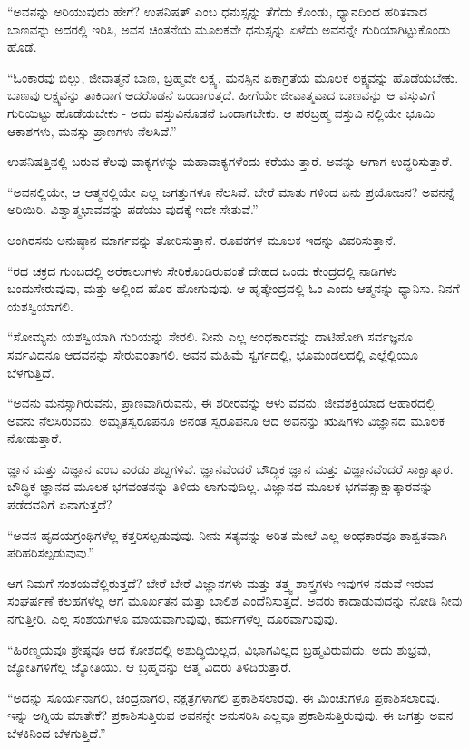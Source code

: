 “ಅವನನ್ನು ಅರಿಯುವುದು ಹೇಗೆ? ಉಪನಿಷತ್ ಎಂಬ ಧನುಸ್ಸನ್ನು ತೆಗೆದು ಕೊಂಡು, ಧ್ಯಾನದಿಂದ ಹರಿತವಾದ ಬಾಣವನ್ನು ಅದರಲ್ಲಿ ಇರಿಸಿ, ಅವನ ಚಿಂತನೆಯ ಮೂಲಕವೇ ಧನುಸ್ಸನ್ನು ಏಳೆದು ಅವನನ್ನೇ ಗುರಿಯಾಗಿಟ್ಟುಕೊಂಡು ಹೊಡೆ.

“ಓಂಕಾರವು ಬಿಲ್ಲು, ಜೀವಾತ್ಮನೆ ಬಾಣ, ಬ್ರಹ್ಮವೇ ಲಕ್ಷ್ಯ. ಮನಸ್ಸಿನ ಏಕಾಗ್ರತೆಯ ಮೂಲಕ ಲಕ್ಷ್ಯವನ್ನು ಹೊಡೆಯಬೇಕು. ಬಾಣವು ಲಕ್ಷ್ಯವನ್ನು ತಾಕಿದಾಗ ಅದರೊಡನೆ ಒಂದಾಗುತ್ತದೆ. ಹೀಗೆಯೇ ಜೀವಾತ್ಮವಾದ ಬಾಣವನ್ನು ಆ ವಸ್ತುವಿಗೆ ಗುರಿಯಿಟ್ಟು ಹೊಡೆಯಬೇಕು - ಅದು ವಸ್ತುವಿನೊಡನೆ ಒಂದಾಗಬೇಕು. ಆ ಪರಬ್ರಹ್ಮ ವಸ್ತುವಿ ನಲ್ಲಿಯೇ ಭೂಮಿ ಆಕಾಶಗಳು, ಮನಸ್ಸು ಪ್ರಾಣಗಳು ನೆಲಸಿವೆ.”

ಉಪನಿಷತ್ತಿನಲ್ಲಿ ಬರುವ ಕೆಲವು ವಾಕ್ಯಗಳನ್ನು ಮಹಾವಾಕ್ಯಗಳೆಂದು ಕರೆಯು ತ್ತಾರೆ. ಅವನ್ನು ಆಗಾಗ ಉದ್ಧರಿಸುತ್ತಾರೆ.

“ಅವನಲ್ಲಿಯೇ, ಆ ಆತ್ಮನಲ್ಲಿಯೇ ಎಲ್ಲ ಜಗತ್ತುಗಳೂ ನೆಲಸಿವೆ. ಬೇರೆ ಮಾತು ಗಳಿಂದ ಏನು ಪ್ರಯೋಜನ? ಅವನನ್ನೆ ಅರಿಯಿರಿ. ವಿಶ್ವಾತ್ಮಭಾವವನ್ನು ಪಡೆಯು ವುದಕ್ಕೆ ಇದೇ ಸೇತುವೆ.”

ಅಂಗಿರಸನು ಅನುಷ್ಠಾನ ಮಾರ್ಗವನ್ನು ತೋರಿಸುತ್ತಾನೆ. ರೂಪಕಗಳ ಮೂಲಕ ಇದನ್ನು ವಿವರಿಸುತ್ತಾನೆ.

“ರಥ ಚಕ್ರದ ಗುಂಬದಲ್ಲಿ ಅರೆಕಾಲುಗಳು ಸೇರಿಕೊಂಡಿರುವಂತೆ ದೇಹದ ಒಂದು ಕೇಂದ್ರದಲ್ಲಿ ನಾಡಿಗಳು ಬಂದುಸೇರುವುವು, ಮತ್ತು ಅಲ್ಲಿಂದ ಹೊರ ಹೋಗುವುವು. ಆ ಹೃತ್ಕೇಂದ್ರದಲ್ಲಿ ಓಂ ಎಂದು ಆತ್ಮನನ್ನು ಧ್ಯಾನಿಸು. ನಿನಗೆ ಯಶಸ್ವಿಯಾಗಲಿ.

“ಸೋಮ್ಯನು ಯಶಸ್ವಿಯಾಗಿ ಗುರಿಯನ್ನು ಸೇರಲಿ. ನೀನು ಎಲ್ಲ ಅಂಧಕಾರವನ್ನು ದಾಟಿಹೋಗಿ ಸರ್ವಜ್ಞನೂ ಸರ್ವವಿದನೂ ಆದವನನ್ನು ಸೇರುವಂತಾಗಲಿ. ಅವನ ಮಹಿಮೆ ಸ್ವರ್ಗದಲ್ಲಿ, ಭೂಮಂಡಲದಲ್ಲಿ ಎಲ್ಲೆಲ್ಲಿಯೂ ಬೆಳಗುತ್ತಿದೆ.

“ಅವನು ಮನಸ್ಸಾಗಿರುವನು, ಪ್ರಾಣವಾಗಿರುವನು, ಈ ಶರೀರವನ್ನು ಆಳು ವವನು. ಜೀವಶಕ್ತಿಯಾದ ಆಹಾರದಲ್ಲಿ ಅವನು ನೆಲಸಿರುವನು. ಅಮೃತಸ್ವರೂಪನೂ ಅನಂತ ಸ್ವರೂಪನೂ ಆದ ಅವನನ್ನು ಋಷಿಗಳು ವಿಜ್ಞಾನದ ಮೂಲಕ ನೋಡುತ್ತಾರೆ.

ಜ್ಞಾನ ಮತ್ತು ವಿಜ್ಞಾನ ಎಂಬ ಎರಡು ಶಬ್ದಗಳಿವೆ. ಜ್ಞಾನವೆಂದರೆ ಬೌದ್ಧಿಕ ಜ್ಞಾನ ಮತ್ತು ವಿಜ್ಞಾನವೆಂದರೆ ಸಾಕ್ಷಾತ್ಕಾರ. ಬೌದ್ಧಿಕ ಜ್ಞಾನದ ಮೂಲಕ ಭಗವಂತನನ್ನು ತಿಳಿಯ ಲಾಗುವುದಿಲ್ಲ. ವಿಜ್ಞಾನದ ಮೂಲಕ ಭಗವತ್ಸಾಕ್ಷಾತ್ಕಾರವನ್ನು ಪಡೆದವನಿಗೆ ಏನಾಗುತ್ತದೆ?

“ಅವನ ಹೃದಯಗ್ರಂಥಿಗಳೆಲ್ಲ ಕತ್ತರಿಸಲ್ಪಡುವುವು. ನೀನು ಸತ್ಯವನ್ನು ಅರಿತ ಮೇಲೆ ಎಲ್ಲ ಅಂಧಕಾರವೂ ಶಾಶ್ವತವಾಗಿ ಪರಿಹರಿಸಲ್ಪಡುವುವು.”

ಆಗ ನಿಮಗೆ ಸಂಶಯವೆಲ್ಲಿರುತ್ತದೆ? ಬೇರೆ ಬೇರೆ ವಿಜ್ಞಾನಗಳು ಮತ್ತು ತತ್ತ್ವ ಶಾಸ್ತ್ರಗಳು ಇವುಗಳ ನಡುವೆ ಇರುವ ಸಂಘರ್ಷಣೆ ಕಲಹಗಳೆಲ್ಲ ಆಗ ಮೂರ್ಖತನ ಮತ್ತು ಬಾಲಿಶ ಎಂದೆನಿಸುತ್ತದೆ. ಅವರು ಕಾದಾಡುವುದನ್ನು ನೋಡಿ ನೀವು ನಗುತ್ತೀರಿ. ಎಲ್ಲ ಸಂಶಯಗಳೂ ಮಾಯವಾಗುವುವು, ಕರ್ಮಗಳೆಲ್ಲ ದೂರವಾಗುವುವು.

“ಹಿರಣ್ಮಯವೂ ಶ್ರೇಷ್ಠವೂ ಆದ ಕೋಶದಲ್ಲಿ ಅಶುದ್ಧಿಯಿಲ್ಲದ, ವಿಭಾಗವಿಲ್ಲದ ಬ್ರಹ್ಮವಿರುವುದು. ಅದು ಶುಭ್ರವು, ಜ್ಯೋತಿಗಳಿಗೆಲ್ಲ ಜ್ಯೋತಿಯು. ಆ ಬ್ರಹ್ಮವನ್ನು ಆತ್ಮ ವಿದರು ತಿಳಿದಿರುತ್ತಾರೆ.

“ಅದನ್ನು ಸೂರ್ಯನಾಗಲಿ, ಚಂದ್ರನಾಗಲಿ, ನಕ್ಷತ್ರಗಳಾಗಲಿ ಪ್ರಕಾಶಿಸಲಾರವು. ಈ ಮಿಂಚುಗಳೂ ಪ್ರಕಾಶಿಸಲಾರವು. ಇನ್ನು ಅಗ್ನಿಯ ಮಾತೇಕೆ? ಪ್ರಕಾಶಿಸುತ್ತಿರುವ ಅವನನ್ನೇ ಅನುಸರಿಸಿ ಎಲ್ಲವೂ ಪ್ರಕಾಶಿಸುತ್ತಿರುವುವು. ಈ ಜಗತ್ತು ಅವನ ಬೆಳಕಿನಿಂದ ಬೆಳಗುತ್ತಿದೆ.”

